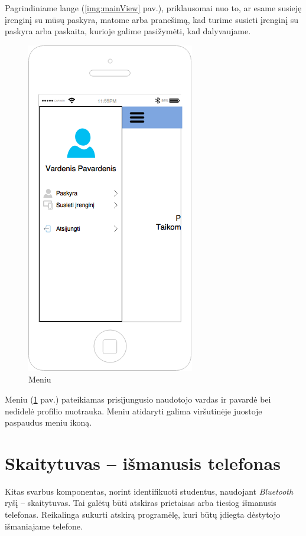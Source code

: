 \documentclass{VUMIFPSbakalaurinis}
\begin{document}
Pagrindiniame lange (\ref{img:mainView} pav.), priklausomai nuo to, ar esame susieję įrenginį su mūsų paskyra, matome arba pranešimą, kad turime susieti įrenginį su paskyra arba paskaita, kurioje galime pasižymėti, kad dalyvaujame.

\begin{figure}[H]
	\centering
	\includegraphics[scale=0.5]{img/kursinio_app_menu}
	\caption{Meniu}
	\label{img:menuView}
\end{figure}

Meniu (\ref{img:menuView} pav.) pateikiamas prisijungusio naudotojo vardas ir pavardė bei nedidelė profilio nuotrauka. Meniu atidaryti galima viršutinėje juostoje paspaudus meniu ikoną.

\section{Skaitytuvas – išmanusis telefonas} \label{TeacherApp}
Kitas svarbus komponentas, norint identifikuoti studentus, naudojant \textit{Bluetooth} ryšį – skaitytuvas. Tai galėtų būti atskiras prietaisas arba tiesiog išmanusis telefonas. Reikalinga sukurti atskirą programėlę, kuri būtų įdiegta dėstytojo išmaniajame telefone.
\end{document}

